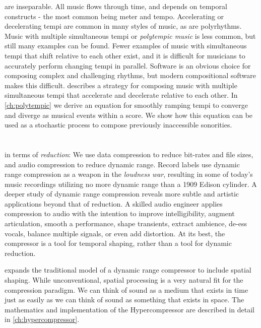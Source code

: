  are inseparable. All music flows through
time, and depends on temporal constructs - the most common being meter
and tempo. Accelerating or decelerating tempi are common in many
styles of music, as are polyrhythms.  Music with multiple simultaneous
tempi or \textit{polytempic music} is less common, but still many
examples can be found. Fewer examples of music with simultaneous tempi
that shift relative to each other exist, and it is difficult for
musicians to accurately perform changing tempi in parallel. Software
is an obvious choice for composing complex and challenging rhythms,
but modern compositional software makes this difficult. \polytempic
describes a strategy for composing music with multiple simultaneous
tempi that accelerate and decelerate relative to each other. In
\autoref{ch:polytempic} we derive an equation for smoothly ramping
tempi to converge and diverge as musical events within a score. We
show how this equation can be used as a stochastic process to compose
previously inaccessible sonorities. 

\section{\thesis}
\label{sec:hypercompression-intro}
 in terms of
\emph{reduction}: We use data compression to reduce bit-rates and file
sizes, and audio compression to reduce dynamic range. Record labels
use dynamic range compression as a weapon in the \emph{loudness
  war}\cite{Deruty2014a}, resulting in some of today's music
recordings utilizing no more dynamic range than a 1909 Edison
cylinder.\cite{Katz2007} A deeper study of dynamic range compression
reveals more subtle and artistic applications beyond that of
reduction. A skilled audio engineer applies compression to audio with
the intention to improve intelligibility, augment articulation, smooth
a performance, shape transients, extract ambience, de-ess vocals,
balance multiple signals, or even add distortion.\cite{Case2007} At
its best, the compressor is a tool for temporal shaping, rather than a
tool for dynamic reduction.

\thesis expands the traditional model of a dynamic range compressor to
include spatial shaping. While unconventional, spatial
processing is a very natural fit for the compression paradigm. We can
think of sound as a medium that exists in time just as easily as we
can think of sound as something that exists in
space. The mathematics and implementation of the
Hypercompressor are described in detail in \autoref{ch:hypercompressor}.

